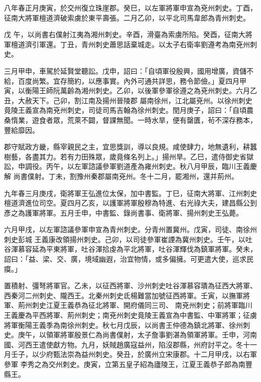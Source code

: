 \begin{pinyinscope}
 八年春正月庚寅，於交州復立珠崖郡。癸巳，以左軍將軍申宣為兗州刺史。丁酉，征南大將軍檀道濟破索虜於東平壽張。二月乙卯，以平北司馬韋郎為青州刺史。



 戊
 午，以尚書右僕射江夷為湘州刺史。辛酉，滑臺為索虜所陷。癸酉，征南大將軍檀道濟引軍還。丁丑，青州刺史蕭思話棄城走。以太子右衛率劉遵考為南兗州刺史。



 三月甲申，車駕於延賢堂聽訟。戊申，詔曰：「自頃軍役殷興，國用增廣，資儲不給，百度尚繁。宜存簡約，以應事實。內外可通共詳思，務令節儉。」夏四月甲寅，以衡陽王師阮萬齡為湘州刺史。乙卯，以後軍參軍徐遵之為兗州刺史。六月乙丑，大赦天下。己卯，割江南及揚州晉陵郡
 屬南徐州，江北屬兗州。以徐州刺史竟陵王義宣為南兗州刺史，司徒司馬吉翰為徐州刺史。閏月庚子，詔曰：「自頃農桑惰業，遊食者眾，荒萊不闢，督課無聞。一時水旱，便有罄匱，茍不深存務本，豐給靡因。



 郡守賦政方畿，縣宰親民之主，宜思獎訓，導以良規。咸使肆力，地無遺利，耕蠶樹藝，各盡其力。若有力田殊眾，歲竟條名列上。」揚州旱。乙巳，遣侍御史省獄訟，申調役。丙午，以左軍諮議參軍劉道產為雍州刺史。秋八月甲辰，臨川王義慶解
 尚書僕射。丁未，割豫州秦郡屬南兗州。冬十二月，罷湘州，還并荊州。



 九年春三月庚戌，衛將軍王弘進位太保，加中書監。丁巳，征南大將軍、江州刺史檀道濟進位司空。夏四月乙亥，以護軍將軍殷穆為特進、右光祿大夫，建昌縣公到彥之為護軍將軍。五月壬申，中書監、錄尚書事、衛將軍、揚州刺史王弘薨。



 六月甲戌，以左軍諮議參軍申宣為青州刺史。分青州置冀州。戊寅，司徒、南徐州刺史彭城
 王義康改領揚州刺史。己卯，以司徒參軍崔諲為冀州刺史。壬午，以吐谷渾慕容延為平東將軍，吐谷渾拾虔為平北將軍，吐谷渾輝伐為鎮軍將軍。癸未，詔曰：「益、梁、交、廣，境域幽遐，治宜物情，或多偏擁。可更遣大使，巡求民瘼。」



 置積射、彊弩將軍官。乙未，以征西將軍、沙州刺史吐谷渾慕容璝為征西大將軍、西秦河二州刺史、隴西王。北秦州刺史氐楊難當加號征西將軍。壬寅，以撫軍將軍、荊州刺史江夏王義恭為征北將軍、開府儀同三司、
 南兗州刺史；前將軍臨川王義慶為平西將軍、荊州刺史；南兗州刺史竟陵王義宣為中書監、中軍將軍；征虜將軍衡陽王義季為南徐州刺史。秋七月戊辰，以尚書王仲德為鎮北將軍、徐州刺史。庚午，以領軍將軍殷景仁為尚書僕射，太子詹事劉湛為領軍將軍。壬申，河南國、河西王遣使獻方物。九月，妖賊趙廣寇益州，陷沒郡縣，州府討平之。冬十一月壬子，以少府甄法崇為益州刺史。癸丑，於廣州立宋康郡。十二月甲戌，以右軍參軍
 李秀之為交州刺史。庚寅，立第五皇子紹為廬陵王，江夏王義恭子郎為南豐縣王。




\end{pinyinscope}
